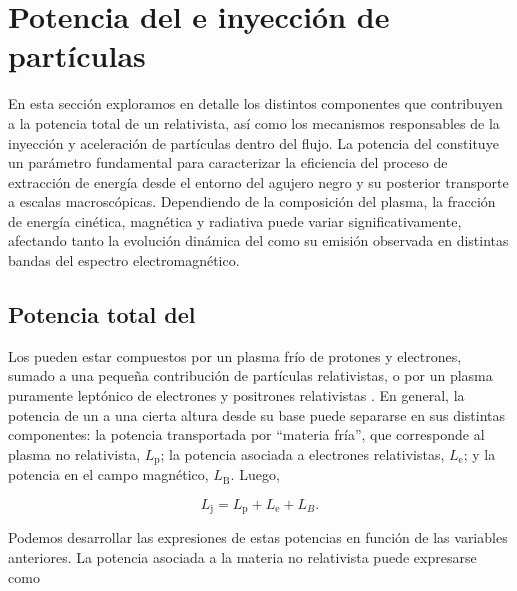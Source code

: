 \section{Potencia del \jet e inyección de partículas}

	En esta sección exploramos en detalle los distintos componentes que contribuyen a la potencia total de un \jet relativista, así como los mecanismos responsables de la inyección y aceleración de partículas dentro del flujo.
	La potencia del \jet constituye un parámetro fundamental para caracterizar la eficiencia del proceso de extracción de energía desde el entorno del agujero negro y su posterior transporte a escalas macroscópicas.
	Dependiendo de la composición del plasma, la fracción de energía cinética, magnética y radiativa puede variar significativamente, afectando tanto la evolución dinámica del \jet como su emisión observada en distintas bandas del espectro electromagnético.

\subsection{Potencia total del \jet}

	Los \jets pueden estar compuestos por un plasma frío de protones y electrones, sumado a una pequeña contribución de partículas relativistas, o por un plasma puramente leptónico de electrones y positrones relativistas \citep{Romero2017}.
	En general, la potencia de un \jet a una cierta altura desde su base puede separarse en sus distintas componentes: la potencia transportada por ``materia fría'', que corresponde al plasma no relativista, $L_\text{p}$; la potencia asociada a electrones relativistas, $L_\text{e}$; y la potencia en el campo magnético, $L_\text{B}$.
	Luego,


\begin{equation}\label{eq:mod-11}
    L_\text{j}=L_\text{p}+L_\text{e}+L_{B}.
\end{equation}

	Podemos desarrollar las expresiones de estas potencias en función de las variables anteriores.
	La potencia asociada a la materia no relativista puede expresarse como

